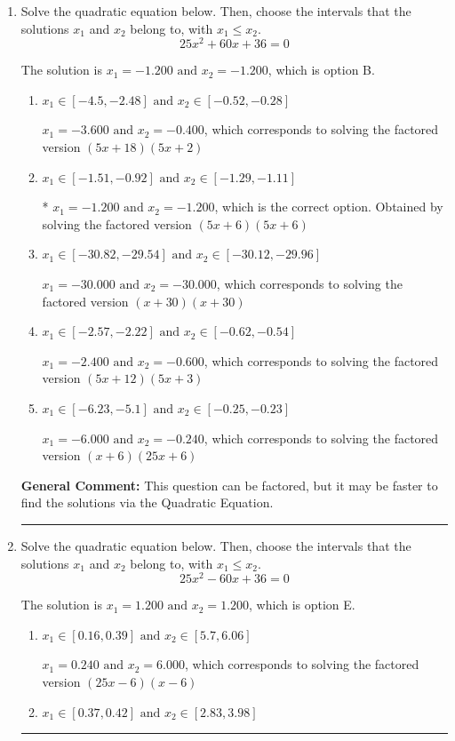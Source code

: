 \documentclass{extbook}[14pt]
\newcommand{\litem}[1]{\item #1

\rule{\textwidth}{0.4pt}}
\begin{document}
\begin{enumerate}\litem{
Solve the quadratic equation below. Then, choose the intervals that the solutions $x_1$ and $x_2$ belong to, with $x_1 \leq x_2$.
\[ 25x^{2} +60 x + 36 = 0 \]

The solution is \( x_1 = -1.200 \text{ and } x_2 = -1.200 \), which is option B.\begin{enumerate}[label=\Alph*.]
\item \( x_1 \in [-4.5, -2.48] \text{ and } x_2 \in [-0.52, -0.28] \)

$x_1 = -3.600 \text{ and } x_2 = -0.400$, which corresponds to solving the factored version $(5x + 18)(5x + 2)$
\item \( x_1 \in [-1.51, -0.92] \text{ and } x_2 \in [-1.29, -1.11] \)

* $x_1 = -1.200 \text{ and } x_2 = -1.200$, which is the correct option. Obtained by solving the factored version $(5x + 6)(5x + 6)$
\item \( x_1 \in [-30.82, -29.54] \text{ and } x_2 \in [-30.12, -29.96] \)

$x_1 = -30.000 \text{ and } x_2 = -30.000$, which corresponds to solving the factored version $(x + 30)(x + 30)$
\item \( x_1 \in [-2.57, -2.22] \text{ and } x_2 \in [-0.62, -0.54] \)

$x_1 = -2.400 \text{ and } x_2 = -0.600$, which corresponds to solving the factored version $(5x + 12)(5x + 3)$
\item \( x_1 \in [-6.23, -5.1] \text{ and } x_2 \in [-0.25, -0.23] \)

$x_1 = -6.000 \text{ and } x_2 = -0.240$, which corresponds to solving the factored version $(x + 6)(25x + 6)$
\end{enumerate}

\textbf{General Comment:} This question can be factored, but it may be faster to find the solutions via the Quadratic Equation.
}
\litem{
Solve the quadratic equation below. Then, choose the intervals that the solutions $x_1$ and $x_2$ belong to, with $x_1 \leq x_2$.
\[ 25x^{2} -60 x + 36 = 0 \]

The solution is \( x_1 = 1.200 \text{ and } x_2 = 1.200 \), which is option E.\begin{enumerate}[label=\Alph*.]
\item \( x_1 \in [0.16, 0.39] \text{ and } x_2 \in [5.7, 6.06] \)

$x_1 = 0.240 \text{ and } x_2 = 6.000$, which corresponds to solving the factored version $(25x -6)(x -6)$
\item \( x_1 \in [0.37, 0.42] \text{ and } x_2 \in [2.83, 3.98] \)


\end{enumerate}}
\end{enumerate}
\end{document}
